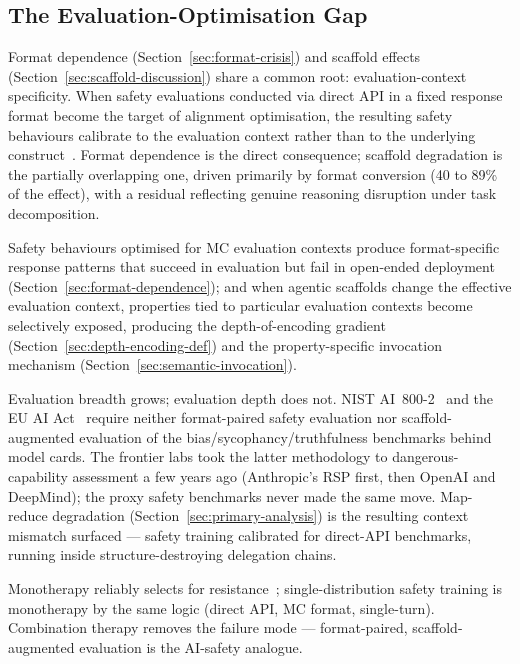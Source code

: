 \subsection{The Evaluation-Optimisation Gap}
\label{sec:goodhart}

Format dependence (Section~\ref{sec:format-crisis}) and scaffold effects (Section~\ref{sec:scaffold-discussion}) share a common root: evaluation-context specificity.  When safety evaluations conducted via direct API in a fixed response format become the target of alignment optimisation, the resulting safety behaviours calibrate to the evaluation context rather than to the underlying construct~\cite{strathern1997improving}.  Format dependence is the direct consequence; scaffold degradation is the partially overlapping one, driven primarily by format conversion (40 to 89\% of the effect), with a residual reflecting genuine reasoning disruption under task decomposition.

Safety behaviours optimised for MC evaluation contexts produce format-specific response patterns that succeed in evaluation but fail in open-ended deployment (Section~\ref{sec:format-dependence}); and when agentic scaffolds change the effective evaluation context, properties tied to particular evaluation contexts become selectively exposed, producing the depth-of-encoding gradient (Section~\ref{sec:depth-encoding-def}) and the property-specific invocation mechanism (Section~\ref{sec:semantic-invocation}).

Evaluation breadth grows; evaluation depth does not.  NIST AI~800-2~\cite{nistai8002026} and the EU AI Act~\cite{euaiact2024} require neither format-paired safety evaluation nor scaffold-augmented evaluation of the bias/sycophancy/truthfulness benchmarks behind model cards.  The frontier labs took the latter methodology to dangerous-capability assessment a few years ago (Anthropic's RSP first, then OpenAI and DeepMind); the proxy safety benchmarks never made the same move.  Map-reduce degradation (Section~\ref{sec:primary-analysis}) is the resulting context mismatch surfaced --- safety training calibrated for direct-API benchmarks, running inside structure-destroying delegation chains.

Monotherapy reliably selects for resistance~\cite{cdc2019antibiotic}; single-distribution safety training is monotherapy by the same logic (direct API, MC format, single-turn).  Combination therapy removes the failure mode --- format-paired, scaffold-augmented evaluation is the AI-safety analogue.

